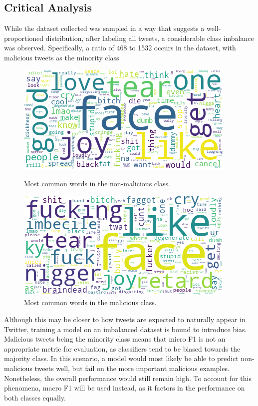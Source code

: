 \documentclass[a4paper,12pt]{article}
\begin{document}
\subsection{Critical Analysis}
\label{section:critical}
While the dataset collected was sampled in a way that suggests a well-proportioned distribution, after labeling all tweets, a considerable class imbalance was observed. Specifically, a ratio of 468 to 1532 occurs in the dataset, with malicious tweets as the minority class.
\begin{figure}[H]
\captionsetup{justification=centering}
   \begin{minipage}{0.48\textwidth}
     \centering
     \includegraphics[width=.9\linewidth]{wordclouds/good.png}
     \caption{Most common words in the non-malicious class.}\label{fig:goodwords}
   \end{minipage}\hfill
   \begin{minipage}{0.48\textwidth}
     \centering
     \includegraphics[width=.9\linewidth]{wordclouds/bad.png}
     \caption{Most common words in the malicious class.}\label{fig:badwords}
   \end{minipage}
\end{figure}
Although this may be closer to how tweets are expected to naturally appear in Twitter, training a model on an imbalanced dataset is bound to introduce bias. Malicious tweets being the minority class means that micro F1 is not an appropriate metric for evaluation, as classifiers tend to be biased towards the majority class. In this scenario, a model would most likely be able to predict non-malicious tweets well, but fail on the more important malicious examples. Nonetheless, the overall performance would still remain high. To account for this phenomena, macro F1 will be used instead, as it factors in the performance on both classes equally.
\end{document}
